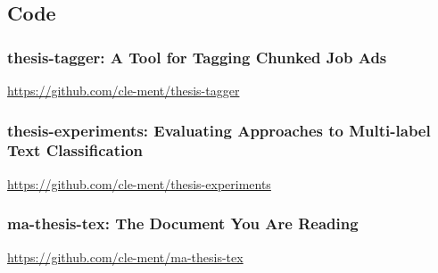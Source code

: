 \clearpage


% 
% 




\clearpage

\subsection{Code}

\subsubsection*{thesis-tagger: A Tool for Tagging Chunked Job Ads}
\label{sub:thesis-tagger: A Tool for Tagging Chunked Job Ads}

\url{https://github.com/cle-ment/thesis-tagger}

\subsubsection*{thesis-experiments: Evaluating Approaches to Multi-label Text Classification}
\label{sub:thesis-experiments: Evaluating Approaches to Multi-label Text Classification}


\url{https://github.com/cle-ment/thesis-experiments}

\subsubsection*{ma-thesis-tex: The Document You Are Reading}
\label{sub:ma-thesis-tex: The Document You Are Reading}

\url{https://github.com/cle-ment/ma-thesis-tex}

